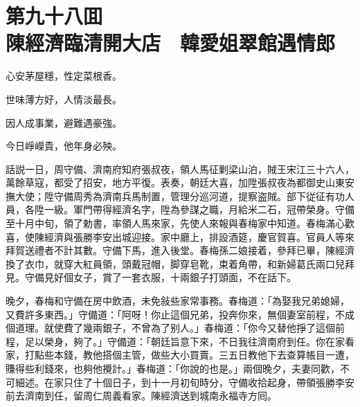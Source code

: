 
\chapter*{第九十八囬　\\陳經濟臨清開大店　韓愛姐翠館遇情郎}


\begin{myquote}
心安茅屋穩，性定菜根香。

世味薄方好，人情淡最長。

因人成事業，避難遇豪強。

今日崢嶸貴，他年身必殃。
\end{myquote}

話説一日，周守備、濟南府知府張叔夜，領人馬征剿梁山泊，賊王宋江三十六人，萬餘草寇，都受了招安，地方平復。表奏，朝廷大喜，加陞張叔夜為都御史山東安撫大使；陞守備周秀為濟南兵馬制置，管理分巡河道，提察盗賊。部下従征有功人員，各陞一級。軍門帶得經濟名字，陞為參謀之職，月給米二石，冠帶榮身。守備至十月中旬，領了勅書，率領人馬來家，先使人來報與春梅家中知道。春梅滿心歡喜，使陳經濟與張勝李安出城迎接。家中廳上，排設酒筵，慶官賀喜。官員人等來拜賀送禮者不計其數。守備下馬，進入後堂。春梅孫二娘接着，參拜已畢，陳經濟換了衣巾，就穿大紅員領，頭戴冠帽，脚穿皂靴，束着角帶，和新婦葛氏兩口兒拜見。守備見好個女子，賞了一套衣服，十兩銀子打頭面，不在話下。

晚夕，春梅和守備在房中飲酒，未免敍些家常事務。春梅道：「為娶我兄弟媳婦，又費許多東西。」守備道：「阿呀！你止這個兄弟，投奔你來，無個妻室前程，不成個道理。就使費了幾兩銀子，不曾為了别人。」春梅道：「你今又替他掙了這個前程，足以榮身，夠了。」守備道：「朝廷旨意下來，不日我往濟南府到任。你在家看家，打點些本錢，教他搭個主管，做些大小買賣。三五日教他下去查算帳目一遭，賺得些利錢來，也夠他攪計。」春梅道：「你說的也是。」兩個晚夕，夫妻同歡，不可細述。在家只住了十個日子，到十一月初旬時分，守備收拾起身，帶領張勝李安前去濟南到任，留周仁周義看家。陳經濟送到城南永福寺方囘。

